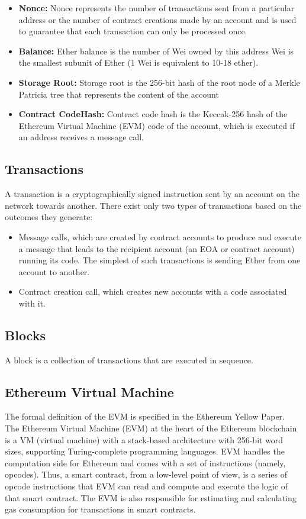         \begin{itemize}
            \item \textbf{Nonce:} Nonce represents the number of transactions sent from a particular address or the number of contract creations made by an account and is used to guarantee that each transaction can only be processed once.
            \item \textbf{Balance:} Ether balance is the number of Wei owned by this address
                Wei is the smallest subunit of Ether (1 Wei is equivalent to 10-18 ether).
            \item \textbf{Storage Root:} Storage root is the 256-bit hash of the root node of a Merkle Patricia tree that represents the content of the account 
            \item \textbf{Contract CodeHash:} Contract code hash is the Keccak-256 hash of the Ethereum Virtual Machine (EVM) code of the account, which is executed if an address receives a message call.
        \end{itemize}

    \subsection{Transactions}
    A transaction is a cryptographically signed instruction sent by an account on the network towards another.
    There exist only two types of transactions based on the outcomes they generate:
    \begin{itemize}
        \item Message calls, which are created by contract accounts to produce and execute a message that leads to the recipient account (an EOA or contract account) running its code. The simplest of such transactions is sending Ether from one account to another.
        \item Contract creation call, which creates new accounts with a code associated with it.
    \end{itemize}

    \subsection{Blocks}
    A block is a collection of transactions that are executed in sequence.
    

    \subsection{Ethereum Virtual Machine}
        The formal definition of the EVM is specified in the Ethereum Yellow Paper.~\cite{wood2014ethereum}
        The Ethereum Virtual Machine (EVM) at the heart of the Ethereum blockchain is a VM (virtual machine) with a stack-based architecture with 256-bit word sizes, supporting Turing-complete programming languages.
        EVM handles the computation side for Ethereum and comes with a set of instructions (namely, opcodes).
        Thus, a smart contract, from a low-level point of view, is a series of opcode instructions that EVM can read and compute and execute the logic of that smart contract.
        The EVM is also responsible for estimating and calculating gas consumption for transactions in smart contracts.


